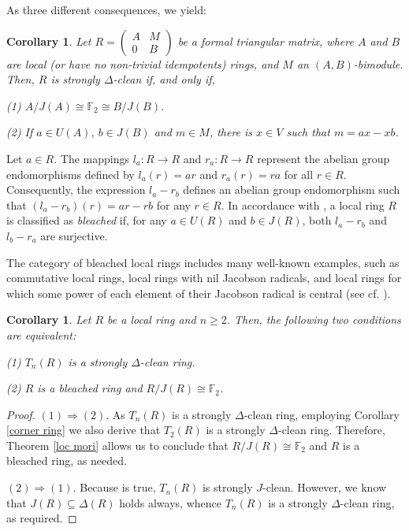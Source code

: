 \documentclass[12pt]{amsart}
\newtheorem{corollary}[theorem]{Corollary}
\theoremstyle{definition}
\begin{document}
As three different consequences, we yield:

\begin{corollary}
Let $R = \begin{pmatrix}
A & M \\
0 & B
\end{pmatrix}$ be a formal triangular matrix, where $A$ and $B$ are local (or have no non-trivial idempotents) rings, and $M$ an $(A, B)$-bimodule. Then, $R$ is strongly $\Delta$-clean if, and only if,

(1) $A/J(A) \cong \mathbb{F}_2 \cong B/J(B)$.

(2) If $a \in U(A)$, $b \in J(B)$ and $m \in M$, there is $x \in V$ such that $m = ax - xb$.
\end{corollary}

Let $ a \in R $. The mappings $ l_a: R \to R $ and $ r_a: R \to R $ represent the abelian group endomorphisms defined by $ l_a(r) = ar $ and $ r_a(r) = ra $ for all $ r \in R $. Consequently, the expression $ l_a - r_b $ defines an abelian group endomorphism such that $ (l_a - r_b)(r) = ar - rb $ for any $ r \in R $. In accordance with
\cite{diesl}, a local ring $ R $ is classified as {\it bleached} if, for any $ a \in U(R) $ and $ b \in J(R) $, both
$l_a - r_b$ and $l_b - r_a$ are surjective.

The category of bleached local rings includes many well-known examples, such as commutative local rings, local rings with nil Jacobson radicals, and local rings for which some power of each element of their Jacobson radical is central (see cf. \cite[Example 13]{bdd}).

\begin{corollary}\label{11}
Let $R$ be a local ring and $n\geq 2$. Then, the following two conditions are equivalent:
	
(1) $T_n(R)$ is a strongly $\Delta$-clean ring.
	
(2) \( R \) is a bleached ring and \( R/J(R) \cong \mathbb{F}_2 \).
\end{corollary}

\begin{proof}
$(1) \Rightarrow (2)$. As $T_n(R)$ is a strongly $\Delta$-clean ring, employing Corollary \ref{corner ring} we also derive that $T_2(R)$ is a strongly $\Delta$-clean ring. Therefore, Theorem \ref{loc mori} allows us to conclude that $R/J(R) \cong \mathbb{F}_2$ and $R$ is a bleached ring, as needed.

$(2) \Rightarrow (1)$. Because \cite[Theorem 4.4]{csj} is true, $T_n(R)$ is strongly $J$-clean. However, we know that $J(R)\subseteq \Delta(R)$ holds always, whence $T_n(R)$ is a strongly $\Delta$-clean ring, as required.
\end{proof}
\end{document}
